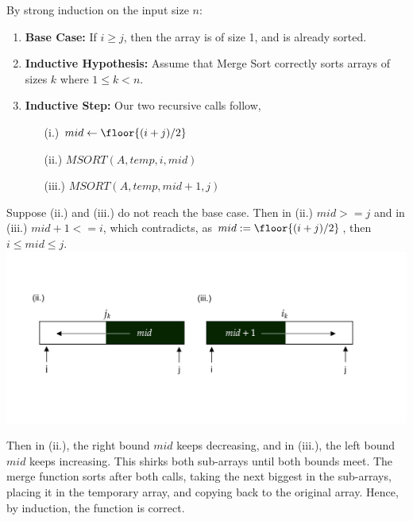 \vspace{-1.5em}
\begin{Proof}

    By strong induction on the input size $n$:
    
    \begin{enumerate}
        \item \textbf{Base Case:}  
        If $i \geq j$, then the array is of size 1, and is already sorted.
        
        \item \textbf{Inductive Hypothesis:}  
        Assume that Merge Sort correctly sorts arrays of sizes $k$ where $1\leq k < n$.
        
        \item \textbf{Inductive Step:}  
        Our two recursive calls follow, 
        \begin{enumerate}
        \item[(i.)] $mid \gets \floor{(i + j) / 2}$
        \item[(ii.)] $MSORT(A, temp, i, mid)$
        \item[(iii.)] $MSORT(A, temp, mid + 1, j)$
        \end{enumerate}
    \end{enumerate}
    \noindent
    Suppose (ii.) and (iii.) do not reach the base case. Then in (ii.) $mid>=j$ and in (iii.) $mid+1<=i$, which contradicts, as
    $mid:=\floor{(i+j)/2}$, then $i\leq mid \leq j$.\\

    \vspace{-4em}
    \includegraphics[width=1\textwidth]{sections/modules/recursive_evaluation/msort_proof.png}

    \vspace{-4em}
    \noindent
    Then in (ii.), the right bound $mid$ keeps decreasing, and in (iii.), the left bound $mid$ keeps increasing.
    This shirks both sub-arrays until both bounds meet. The merge function sorts after both calls, taking the next 
    biggest in the sub-arrays, placing it in the temporary array, and copying back to the original array. Hence, by induction, the function is correct.
\end{Proof}

